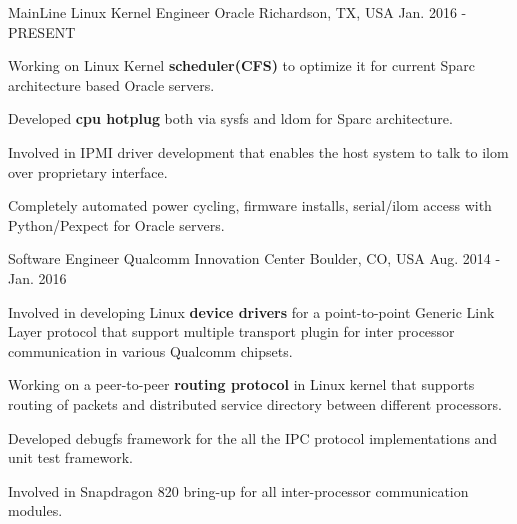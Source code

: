 

\begin{cventries}

  \cventry
    {MainLine Linux Kernel Engineer} %
    {Oracle} %
    {Richardson, TX, USA} %
    {Jan. 2016 - PRESENT} %
    {
	\begin{cvitems} %
	\item {Working on Linux Kernel \textbf{scheduler(CFS)} to optimize it for current Sparc architecture based Oracle servers.}
	\item {Developed \textbf{cpu hotplug} both via sysfs and ldom for Sparc architecture.}
	\item {Involved in IPMI driver development that enables the host system to talk to ilom over proprietary interface.}
	\item {Completely automated power cycling, firmware installs, serial/ilom access with Python/Pexpect for Oracle
servers.}      
	\end{cvitems}
    }

  \cventry
    {Software Engineer} %
    {Qualcomm Innovation Center} %
    {Boulder, CO, USA} %
    {Aug. 2014 - Jan. 2016} %
    {
      \begin{cvitems} %
	\item {Involved in developing Linux \textbf{device drivers} for a point-to-point Generic Link Layer
	protocol that support multiple transport plugin for inter processor communication in various
	Qualcomm chipsets.}
        \item {Working on a peer-to-peer \textbf{routing protocol} in Linux kernel that supports routing
	of packets and distributed service directory between different processors.}
	\item {Developed debugfs framework for the all the IPC protocol implementations and unit test framework.}
	\item {Involved in Snapdragon 820 bring-up for all inter-processor communication modules.}
      \end{cvitems}
    }


\end{cventries}
